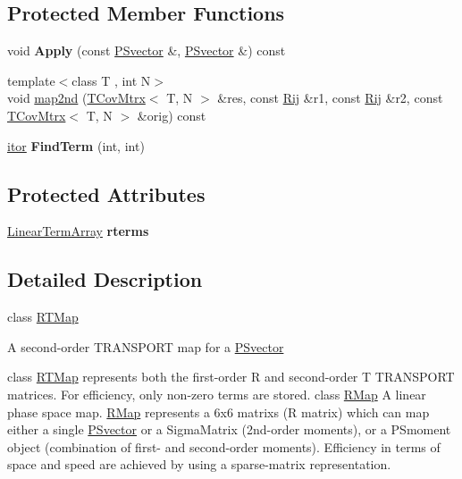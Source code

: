 \subsection*{Protected Member Functions}
\begin{DoxyCompactItemize}
\item 
\mbox{\label{classRMap_a9f6726f7a96974529a5b7b9ce7f86964}} 
void {\bfseries Apply} (const \hyperlink{classPSvector}{P\+Svector} \&, \hyperlink{classPSvector}{P\+Svector} \&) const
\item 
{\footnotesize template$<$class T , int N$>$ }\\void \hyperlink{classRMap_a5b755aa47a586978d9023da0462059ff}{map2nd} (\hyperlink{classTCovMtrx}{T\+Cov\+Mtrx}$<$ T, N $>$ \&res, const \hyperlink{structRMap_1_1Rij}{Rij} \&r1, const \hyperlink{structRMap_1_1Rij}{Rij} \&r2, const \hyperlink{classTCovMtrx}{T\+Cov\+Mtrx}$<$ T, N $>$ \&orig) const
\item 
\mbox{\label{classRMap_a7d3ddceecda5af9bfbd3ae47dc8b165a}} 
\hyperlink{structRMap_1_1Rij}{itor} {\bfseries Find\+Term} (int, int)
\end{DoxyCompactItemize}
\subsection*{Protected Attributes}
\begin{DoxyCompactItemize}
\item 
\mbox{\label{classRMap_a7c5ab45ed9cf3d1d3b9c6e8905c2790a}} 
\hyperlink{structRMap_1_1LinearTermArray}{Linear\+Term\+Array} {\bfseries rterms}
\end{DoxyCompactItemize}


\subsection{Detailed Description}
class \hyperlink{classRTMap}{R\+T\+Map}

A second-\/order T\+R\+A\+N\+S\+P\+O\+RT map for a \hyperlink{classPSvector}{P\+Svector}

class \hyperlink{classRTMap}{R\+T\+Map} represents both the first-\/order R and second-\/order T T\+R\+A\+N\+S\+P\+O\+RT matrices. For efficiency, only non-\/zero terms are stored. class \hyperlink{classRMap}{R\+Map} A linear phase space map. \hyperlink{classRMap}{R\+Map} represents a 6x6 matrixs (R matrix) which can map either a single \hyperlink{classPSvector}{P\+Svector} or a Sigma\+Matrix (2nd-\/order moments), or a P\+Smoment object (combination of first-\/ and second-\/order moments). Efficiency in terms of space and speed are achieved by using a sparse-\/matrix representation. 

